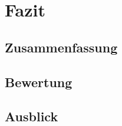 \chapter{Fazit}\label{fazit}

\blindtext[1]

\section{Zusammenfassung}\label{zusammenfassung}

\blindtext[1]

\section{Bewertung}\label{bewertung}

\blindtext[1]

\section{Ausblick}\label{ausblick}

\blindtext[1]
